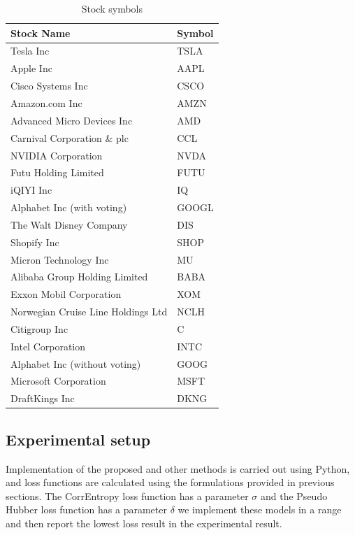 \documentclass[12pt,a4paper]{article}
\begin{document}
	\begin{table}[H]
		\centering
		\caption{Stock symbols}
		\begin{tabular}{ll}
			\hline
			\textbf{Stock Name} & \textbf{Symbol} \\
			\hline
			Tesla Inc & TSLA \\
			Apple Inc & AAPL \\
			Cisco Systems Inc & CSCO \\
			Amazon.com Inc & AMZN \\
			Advanced Micro Devices Inc & AMD \\
			Carnival Corporation \& plc & CCL \\
			NVIDIA Corporation & NVDA \\
			Futu Holding Limited & FUTU \\
			iQIYI Inc & IQ \\
			Alphabet Inc (with voting) & GOOGL \\
			The Walt Disney Company & DIS \\
			Shopify Inc & SHOP \\
			Micron Technology Inc & MU \\
			Alibaba Group Holding Limited & BABA \\
			Exxon Mobil Corporation & XOM \\
			Norwegian Cruise Line Holdings Ltd & NCLH \\
			Citigroup Inc & C \\
			Intel Corporation & INTC \\
			Alphabet Inc (without voting) & GOOG \\
			Microsoft Corporation & MSFT \\
			DraftKings Inc & DKNG \\
			\hline
		\end{tabular}
		\label{tab:table1}
	\end{table}
	
	\subsection{Experimental setup}
	
	Implementation of the proposed and other methods is carried out using Python, and loss functions are calculated using the formulations provided in previous sections. The CorrEntropy loss function has a parameter \(\sigma\) and the Pseudo Hubber loss function has a parameter \(\delta\) we implement these models in a range and then report the lowest loss result in the experimental result.
\end{document}

